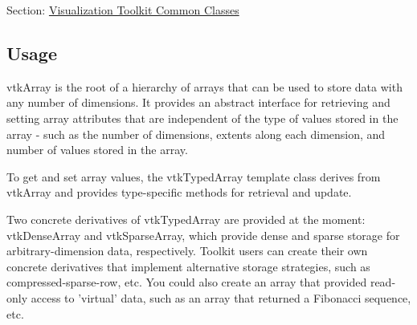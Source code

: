 Section\-: \hyperlink{sec_vtkcommon}{Visualization Toolkit Common Classes} \hypertarget{vtkwidgets_vtkxyplotwidget_Usage}{}\subsection{Usage}\label{vtkwidgets_vtkxyplotwidget_Usage}
vtk\-Array is the root of a hierarchy of arrays that can be used to store data with any number of dimensions. It provides an abstract interface for retrieving and setting array attributes that are independent of the type of values stored in the array -\/ such as the number of dimensions, extents along each dimension, and number of values stored in the array.

To get and set array values, the vtk\-Typed\-Array template class derives from vtk\-Array and provides type-\/specific methods for retrieval and update.

Two concrete derivatives of vtk\-Typed\-Array are provided at the moment\-: vtk\-Dense\-Array and vtk\-Sparse\-Array, which provide dense and sparse storage for arbitrary-\/dimension data, respectively. Toolkit users can create their own concrete derivatives that implement alternative storage strategies, such as compressed-\/sparse-\/row, etc. You could also create an array that provided read-\/only access to 'virtual' data, such as an array that returned a Fibonacci sequence, etc.

